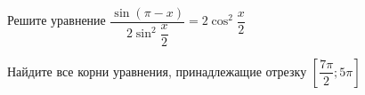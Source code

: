 \begin{ex}
	\begin{condition}
		\begin{enumcols}[label=\asbuk*)]
			\item Решите уравнение \( \dfrac{\sin  {(\pi - x)}}{2 \sin^2 \dfrac{x}{2}} = 2\cos^2 \dfrac{x}{2} \)
			\item Найдите все корни уравнения, принадлежащие отрезку \( \left[\dfrac{7\pi}{2};5\pi\right] \)
		\end{enumcols}
	\end{condition}
\end{ex}